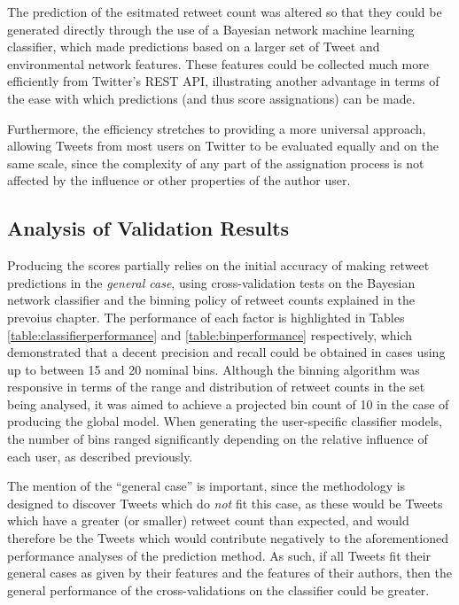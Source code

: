 The prediction of the esitmated retweet count was altered so that they could be generated directly through the use of a Bayesian network machine learning classifier, which made predictions based on a larger set of Tweet and environmental network features. These features could be collected much more efficiently from Twitter's REST API, illustrating another advantage in terms of the ease with which predictions (and thus score assignations) can be made. 

Furthermore, the efficiency stretches to providing a more universal approach, allowing Tweets from most users on Twitter to be evaluated equally and on the same scale, since the complexity of any part of the assignation process is not affected by the influence or other properties of the author user. 


\subsection{Analysis of Validation Results}
Producing the scores partially relies on the initial accuracy of making retweet predictions in the \textit{general case}, using cross-validation tests on the Bayesian network classifier and the binning policy of retweet counts explained in the prevoius chapter. The performance of each factor is highlighted in Tables \ref{table:classifierperformance} and \ref{table:binperformance} respectively, which demonstrated that a decent precision and recall could be obtained in cases using up to between 15 and 20 nominal bins. Although the binning algorithm was responsive in terms of the range and distribution of retweet counts in the set being analysed, it was aimed to achieve a projected bin count of 10 in the case of producing the global model. When generating the user-specific classifier models, the number of bins ranged significantly depending on the relative influence of each user, as described previously.

The mention of the ``general case'' is important, since the methodology is designed to discover Tweets which do \textit{not} fit this case, as these would be Tweets which have a greater (or smaller) retweet count than expected, and would therefore be the Tweets which would contribute negatively to the aforementioned performance analyses of the prediction method. As such, if all Tweets fit their general cases as given by their features and the features of their authors, then the general performance of the cross-validations on the classifier could be greater.

